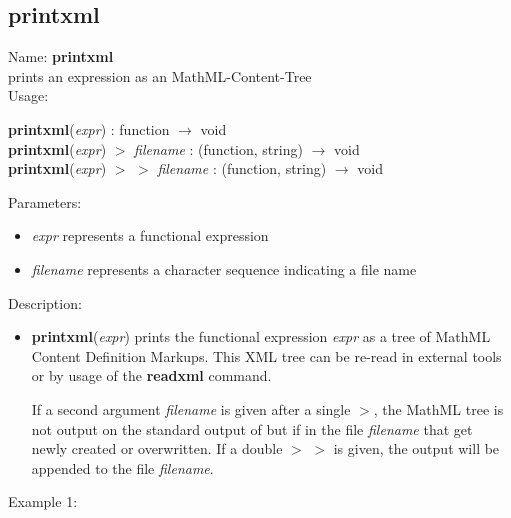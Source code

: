 \subsection{printxml}
\label{labprintxml}
\noindent Name: \textbf{printxml}\\
prints an expression as an MathML-Content-Tree\\
\noindent Usage: 
\begin{center}
\textbf{printxml}(\emph{expr}) : \textsf{function} $\rightarrow$ \textsf{void}\\
\textbf{printxml}(\emph{expr}) $>$ \emph{filename} : (\textsf{function}, \textsf{string}) $\rightarrow$ \textsf{void}\\
\textbf{printxml}(\emph{expr}) $>$ $>$ \emph{filename} : (\textsf{function}, \textsf{string}) $\rightarrow$ \textsf{void}\\
\end{center}
Parameters: 
\begin{itemize}
\item \emph{expr} represents a functional expression
\item \emph{filename} represents a character sequence indicating a file name
\end{itemize}
\noindent Description: \begin{itemize}

\item \textbf{printxml}(\emph{expr}) prints the functional expression \emph{expr} as a tree of
   MathML Content Definition Markups. This XML tree can be re-read in
   external tools or by usage of the \textbf{readxml} command.
    
   If a second argument \emph{filename} is given after a single $>$, the
   MathML tree is not output on the standard output of \sollya but if in
   the file \emph{filename} that get newly created or overwritten. If a double
   $>$ $>$ is given, the output will be appended to the file \emph{filename}.
\end{itemize}
\noindent Example 1: 
